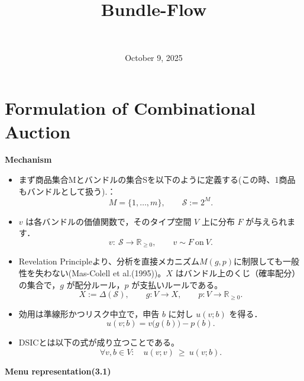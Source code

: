 \documentclass[a4paper]{article}
\title{Bundle-Flow}
\author{\paperauthor \\ \paperaffil}
\date{October 9, 2025}
\begin{document}
\maketitle

\section*{Formulation of Combinational Auction}
\textbf{Mechanism}
\begin{itemize}
    \item まず商品集合Mとバンドルの集合Sを以下のように定義する(この時、1商品もバンドルとして扱う).：
    \begin{equation*}
        M=\{1,\dots,m\},\qquad \mathcal{S}:=2^{M}.
    \end{equation*}
    \item $v$ は各バンドルの価値関数で，そのタイプ空間 $V$ 上に分布 $F$ が与えられます．
    \begin{equation*}
        v:\ \mathcal{S}\to\mathbb{R}_{\ge 0},\qquad v\sim F \ \text{on}\ V.
    \end{equation*}
    \item Revelation Principleより、分析を直接メカニズム$M(g, p)$に制限しても一般性を失わない(Mas-Colell et al.(1995))。$X$ はバンドル上のくじ（確率配分）の集合で，$g$ が配分ルール，$p$ が支払いルールである。
    \begin{equation*}
        X:=\Delta(\mathcal{S}),\qquad g:V\to X,\qquad p:V\to\mathbb{R}_{\ge 0}.
    \end{equation*}
    \item 効用は準線形かつリスク中立で，申告 $b$ に対し $u(v;b)$ を得る．
    \begin{equation*}
    u(v;b)=v\bigl(g(b)\bigr)-p(b).
    \end{equation*}
    \item DSICとは以下の式が成り立つことである。
    \begin{equation*}
    \forall v,b\in V:\quad u(v;v)\ \ge\ u(v;b).
    \end{equation*}  
\end{itemize}
\textbf{Menu representation(3.1)}
\end{document}
